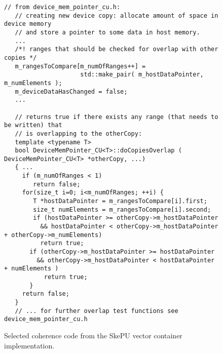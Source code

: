 \begin{figure}
%


\begin{small}
\begin{verbatim}
// from device_mem_pointer_cu.h:
   // creating new device copy: allocate amount of space in device memory
   // and store a pointer to some data in host memory.
   ...
   /*! ranges that should be checked for overlap with other copies */
   m_rangesToCompare[m_numOfRanges++] =
                     std::make_pair( m_hostDataPointer, m_numElements );
   m_deviceDataHasChanged = false;
   ...
 
   // returns true if there exists any range (that needs to be written) that
   // is overlapping to the otherCopy:
   template <typename T>
   bool DeviceMemPointer_CU<T>::doCopiesOverlap ( DeviceMemPointer_CU<T> *otherCopy, ...)
   { ...
     if (m_numOfRanges < 1)
        return false;
     for(size_t i=0; i<m_numOfRanges; ++i) {
        T *hostDataPointer = m_rangesToCompare[i].first;
        size_t numElements = m_rangesToCompare[i].second;
        if (hostDataPointer >= otherCopy->m_hostDataPointer
          && hostDataPointer < otherCopy->m_hostDataPointer + otherCopy->m_numElements)
          return true;
       if (otherCopy->m_hostDataPointer >= hostDataPointer
         && otherCopy->m_hostDataPointer < hostDataPointer + numElements )
           return true;
       }
     return false;
   }
   // ... for further overlap test functions see device_mem_pointer_cu.h
\end{verbatim}
\end{small}
%
\caption{\label{fig:skepucoherence3}Selected coherence code from the SkePU vector container implementation.}
\end{figure}

